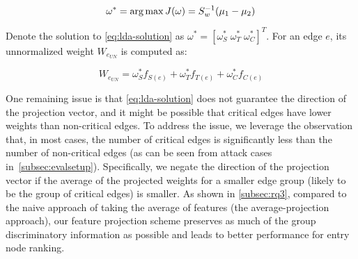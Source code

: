 \begin{equation}
    \label{eq:lda-solution}
    \omega^* = \operatorname*{arg\,max} J(\omega) = S_w^{-1}(\mu_1-\mu_2)
\end{equation}

Denote the solution to \cref{eq:lda-solution} as $\omega^{*} = [\omega^{*}_{S}\; \omega^{*}_{T}\; \omega^{*}_{C}]^T$.
For an edge $e$, its unnormalized weight $W_{e_{UN}}$ is computed as:

\begin{equation}
    \label{eq:projection}
    W_{e_{UN}} = \omega^{*}_{S} f_{S(e)} + \omega^{*}_{T} f_{T(e)} + \omega^{*}_{C} f_{C(e)}
\end{equation}

One remaining issue is that \cref{eq:lda-solution} does not guarantee the direction of the projection vector, and it might be possible that 
critical edges have lower weights than non-critical edges.
To address the issue, we leverage the observation that, in most cases, the number of critical edges is significantly less than the number of non-critical edges (as can be seen from attack cases in~\cref{subsec:evalsetup}).
Specifically, we negate the direction of the projection vector if the average of the projected weights for a smaller edge group (likely to be the group of critical edges) is smaller.
%
As shown in \cref{subsec:rq3}, compared to the naive approach of taking the average of features (the average-projection approach), our feature projection scheme preserves as much of the group discriminatory information as possible and leads to better performance for entry node ranking.








